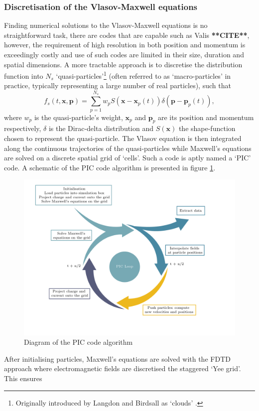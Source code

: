 \subsubsection{Discretisation of the Vlasov-Maxwell equations}
Finding numerical solutions to the Vlasov-Maxwell equations is no straightforward task, there are codes that are capable such as Valis \textbf{**CITE**}, however, the requirement of high resolution in both position and momentum is exceedingly costly and use of such codes are limited in their size, duration and spatial dimensions. A more tractable approach is to discretise the distribution function into $N_s$ `quasi-particles'\footnote{Originally introduced by Langdon and Birdsall as `clouds' \cite{langdonTheoryPlasmaSimulation1970}.}  (often referred to as `macro-particles' in practice, typically representing a large number of real particles), such that
\begin{equation}
	f_s(t,\mathbf{x},\mathbf{p}) = \sum^{N_s}_{p=1} w_p S(\mathbf{x}-\mathbf{x}_p(t))\delta (\mathbf{p}-\mathbf{p}_p(t)),
\end{equation}
where $w_p$ is the quasi-particle's weight, $\mathbf{x}_p$ and $\mathbf{p}_p$ are its position and momentum respectively, $\delta$ is the Dirac-delta distribution and $S(\mathbf{x})$ the shape-function chosen to represent the quasi-particle. The Vlasov equation is then integrated along the continuous trajectories of the quasi-particles while Maxwell's equations are solved on a discrete spatial grid of `cells'. Such a code is aptly named a `\ac{PIC}' code. A schematic of the PIC code algorithm is presented in figure \ref{fig:intropiccycle-01}. 
\begin{figure}
	\centering
	\includegraphics[width=\linewidth]{figures/intro/intro_PIC_cycle-01}
	\caption[Diagram of the PIC code algorithm]{Diagram of the PIC code algorithm}
	\label{fig:intropiccycle-01}
\end{figure}
After initialising particles, Maxwell's equations are solved with the \ac{FDTD} approach \cite{tafloveComputationalElectromagneticsFiniteDifference2005} where electromagnetic fields are discretised the staggered `Yee grid'. This ensures 

